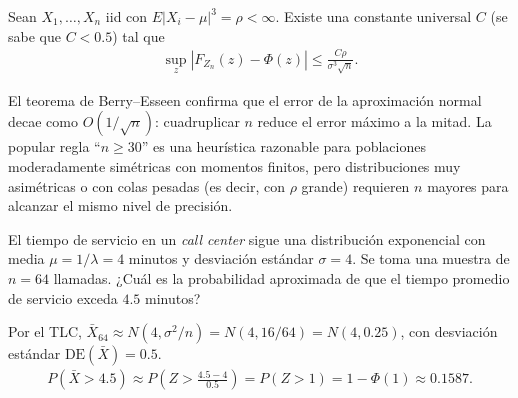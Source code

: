 \begin{teorema}
 \label{eq:5.2.2}
Sean $X_1,\ldots,X_n$ iid con $E|X_i-\mu|^3 = \rho < \infty$. Existe una constante
universal $C$ (se sabe que $C < 0.5$) tal que
\begin{align}
 \sup_z \left|F_{Z_n}(z) - \Phi(z)\right| \le \frac{C\rho}{\sigma^3\sqrt{n}}.
\end{align}
\end{teorema}

\begin{observacion}
El teorema de Berry--Esseen confirma que el error de la aproximaci\'on normal
decae como $O(1/\sqrt{n})$: cuadruplicar $n$ reduce el error m\'aximo a la mitad.
La popular regla ``$n \ge 30$'' es una heur\'istica razonable para poblaciones
moderadamente sim\'etricas con momentos finitos, pero distribuciones muy
asim\'etricas o con colas pesadas (es decir, con $\rho$ grande) requieren $n$
mayores para alcanzar el mismo nivel de precisi\'on.
\end{observacion}

\begin{ejemplo}
 \label{exmp:5.2.1}
El tiempo de servicio en un \emph{call center} sigue una distribuci\'on
exponencial con media $\mu = 1/\lambda = 4$ minutos y desviaci\'on est\'andar
$\sigma = 4$. Se toma una muestra de $n=64$ llamadas. ¿Cu\'al es la probabilidad
aproximada de que el tiempo promedio de servicio exceda $4.5$ minutos?
\end{ejemplo}

\begin{solucion}
Por el TLC, $\bar{X}_{64} \approx N(4, \sigma^2/n) = N(4, 16/64) = N(4, 0.25)$, con
desviaci\'on est\'andar $\text{DE}(\bar{X}) = 0.5$.
\begin{align}
 P(\bar{X} > 4.5) \approx P\!\left(Z > \frac{4.5-4}{0.5}\right) = P(Z>1) = 1-\Phi(1)
 \approx 0.1587.
\end{align}
\end{solucion}
